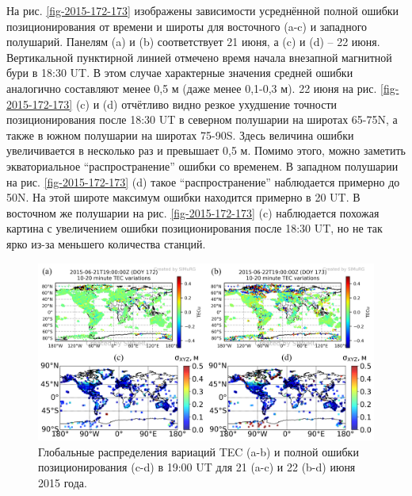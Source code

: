 На рис. \ref{fig-2015-172-173} изображены зависимости усреднённой полной ошибки позиционирования от времени и широты для восточного (a-c) и западного полушарий. 
Панелям (a) и (b) соответствует 21 июня, а (c) и (d) -- 22 июня.
Вертикальной пунктирной линией отмечено время начала внезапной магнитной бури в 18:30 UT. 
В этом случае характерные значения средней ошибки аналогично составляют менее 0,5 м (даже менее 0,1-0,3 м).
22 июня на рис. \ref{fig-2015-172-173} (c) и (d) отчётливо видно резкое ухудшение точности позиционирования после 18:30 UT в северном полушарии на широтах 65-75\degree N, а также в южном полушарии на широтах 75-90\degree S.
Здесь величина ошибки увеличивается в несколько раз и превышает 0,5 м.
Помимо этого, можно заметить экваториальное ``распространение'' ошибки со временем.
В западном полушарии на рис. \ref{fig-2015-172-173} (d) такое ``распространение'' наблюдается примерно до 50\degree N.
На этой широте максимум ошибки находится примерно в 20 UT.
В восточном же полушарии на рис. \ref{fig-2015-172-173} (c) наблюдается похожая картина с увеличением ошибки позиционирования после 18:30 UT, но не так ярко из-за меньшего количества станций.
\begin{figure}[h]
\includegraphics[width=\textwidth]{fig/2015-172-173-19-00.png}    
\caption{Глобальные распределения вариаций TEC (a-b) и полной ошибки позиционирования (c-d) в 19:00 UT для 21 (a-c) и 22 (b-d) июня 2015 года.}
\label{fig-2015-172-173-19-00}
\end{figure}
